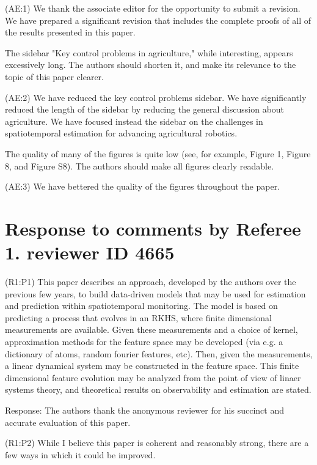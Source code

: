 \documentclass{letter}
\begin{document}
{\color{red}(AE:1)} We thank the associate editor for the opportunity to submit a revision.  We have prepared a significant revision that includes the complete proofs of all of the results presented in this paper. 


The sidebar "Key control problems in agriculture," while
interesting, appears excessively long. The authors should shorten it,
and make its relevance to the topic of this paper clearer.

{\color{red}(AE:2)} We have reduced the key control problems sidebar. We have significantly reduced the length of the sidebar by reducing the general discussion about agriculture. We have focused instead the sidebar on the challenges in spatiotemporal estimation for advancing agricultural robotics.


The quality of many of the figures is quite low (see, for example,
Figure 1, Figure 8, and Figure S8). The authors should make all figures
clearly readable.

{\color{red}(AE:3)} We have bettered the quality of the figures throughout the paper.


\section{Response to comments by Referee 1. reviewer ID 4665}

{\color{red}(R1:P1)} This paper describes an approach, developed by the authors over the
previous few years, to build data-driven models that may be used for
estimation and prediction within spatiotemporal monitoring. The model
is based on predicting a process that evolves in an RKHS, where finite
dimensional measurements are available. Given these measurements and a
choice of kernel, approximation methods for the feature space may be
developed (via e.g. a dictionary of atoms, random fourier features,
etc). Then, given the measurements, a linear dynamical system may be
constructed in the feature space. This finite dimensional feature
evolution may be analyzed from the point of view of linaer systems
theory, and theoretical results on observability and estimation are
stated. 

{\color{red} Response:} The authors thank the anonymous reviewer for his succinct and accurate evaluation of this paper.


{\color{red}(R1:P2)} While I believe this paper is coherent and reasonably strong, there are
a few ways in which it could be improved. 
\end{document}
